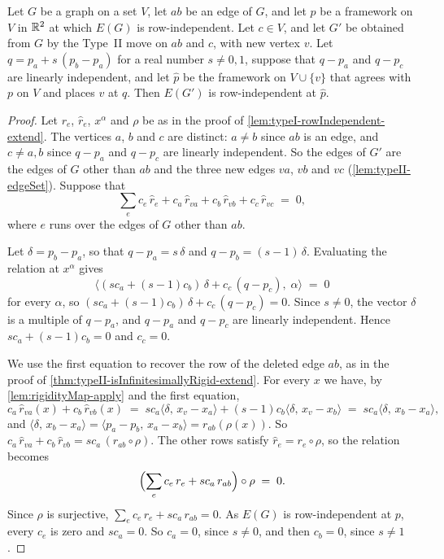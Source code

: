 \begin{lemma}
  \label{lem:typeII-rowIndependent-extend}
  \leanok
  Let $G$ be a graph on a set $V$, let $ab$ be an edge of $G$,
  and let $p$ be a framework on $V$ in ${\mathbb{R}}^{2}$ at which $E(G)$ is
  row-independent. Let $c \in V$, and let $G'$ be obtained from $G$ by
  the Type~II move on $ab$ and $c$, with new vertex $v$. Let
  $q = p_a + s\,(p_b - p_a)$ for a real number $s \ne 0, 1$, suppose
  that $q - p_a$ and $q - p_c$ are linearly independent, and let
  $\hat p$ be the framework on $V \cup \{v\}$ that agrees with $p$ on
  $V$ and places $v$ at $q$. Then $E(G')$ is row-independent at
  $\hat p$.
\end{lemma}
\begin{proof}
  \leanok
  Let $r_e$, $\hat r_e$, $x^{\alpha}$ and $\rho$ be as in the proof of
  \cref{lem:typeI-rowIndependent-extend}. The vertices $a$, $b$ and $c$
  are distinct: $a \ne b$ since $ab$ is an edge, and $c \ne a, b$ since
  $q - p_a$ and $q - p_c$ are linearly independent. So the edges of
  $G'$ are the edges of $G$ other than $ab$ and the three new edges
  $va$, $vb$ and $vc$ (\cref{lem:typeII-edgeSet}). Suppose that
  \[
    \sum_{e} c_e\, \hat r_e + c_a\, \hat r_{va} + c_b\, \hat r_{vb}
      + c_c\, \hat r_{vc} \;=\; 0,
  \]
  where $e$ runs over the edges of $G$ other than $ab$.

  Let $\delta = p_b - p_a$, so that $q - p_a = s\,\delta$ and
  $q - p_b = (s - 1)\,\delta$. Evaluating the relation at $x^{\alpha}$
  gives
  \[
    \bigl\langle (s c_a + (s - 1) c_b)\,\delta + c_c\,(q - p_c),\;
      \alpha \bigr\rangle \;=\; 0
  \]
  for every $\alpha$, so
  $(s c_a + (s - 1) c_b)\,\delta + c_c\,(q - p_c) = 0$. Since
  $s \ne 0$, the vector $\delta$ is a multiple of $q - p_a$, and
  $q - p_a$ and $q - p_c$ are linearly independent. Hence
  $s c_a + (s - 1) c_b = 0$ and $c_c = 0$.

  We use the first equation to recover the row of the deleted edge
  $ab$, as in the proof of
  \cref{thm:typeII-isInfinitesimallyRigid-extend}. For every $x$ we
  have, by \cref{lem:rigidityMap-apply} and the first equation,
  \[
    c_a\, \hat r_{va}(x) + c_b\, \hat r_{vb}(x)
    \;=\; s c_a \langle \delta,\, x_v - x_a \rangle
      + (s - 1) c_b \langle \delta,\, x_v - x_b \rangle
    \;=\; s c_a \langle \delta,\, x_b - x_a \rangle,
  \]
  and $\langle \delta,\, x_b - x_a \rangle
  = \langle p_a - p_b,\, x_a - x_b \rangle = r_{ab}(\rho(x))$. So
  $c_a\, \hat r_{va} + c_b\, \hat r_{vb} = s c_a\, (r_{ab} \circ \rho)$.
  The other rows satisfy $\hat r_e = r_e \circ \rho$, so the relation
  becomes
  \[
    \Bigl(\sum_{e} c_e\, r_e + s c_a\, r_{ab}\Bigr) \circ \rho \;=\; 0.
  \]
  Since $\rho$ is surjective, $\sum_e c_e\, r_e + s c_a\, r_{ab} = 0$.
  As $E(G)$ is row-independent at $p$, every $c_e$ is zero and
  $s c_a = 0$. So $c_a = 0$, since $s \ne 0$, and then $c_b = 0$, since
  $s \ne 1$.
\end{proof}

